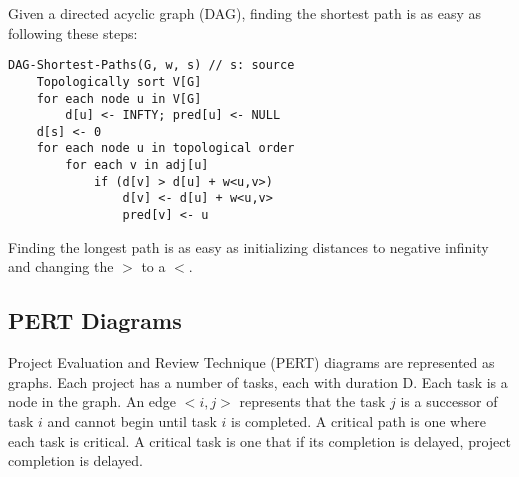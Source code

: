 Given a directed acyclic graph (DAG), finding the shortest path is as
easy as following these steps:
\begin{lstlisting}[label={DAG Shortest Path Algorithm}]
    DAG-Shortest-Paths(G, w, s) // s: source
    Topologically sort V[G]
    for each node u in V[G]
        d[u] <- INFTY; pred[u] <- NULL
    d[s] <- 0
    for each node u in topological order
        for each v in adj[u]
            if (d[v] > d[u] + w<u,v>)
                d[v] <- d[u] + w<u,v>
                pred[v] <- u
\end{lstlisting}

Finding the longest path is as easy as initializing distances to negative infinity
and changing the $>$ to a $<$.


\subsection{PERT Diagrams}
Project Evaluation and Review Technique (PERT) diagrams are represented as graphs.
Each project has a number of tasks, each with duration D.
Each task is a node in the graph. An edge $<i, j>$ represents that the task $j$ is a
successor of task $i$ and cannot begin until task $i$ is completed. A critical path
is one where each task is critical. A critical task is one that if its completion is
delayed, project completion is delayed.